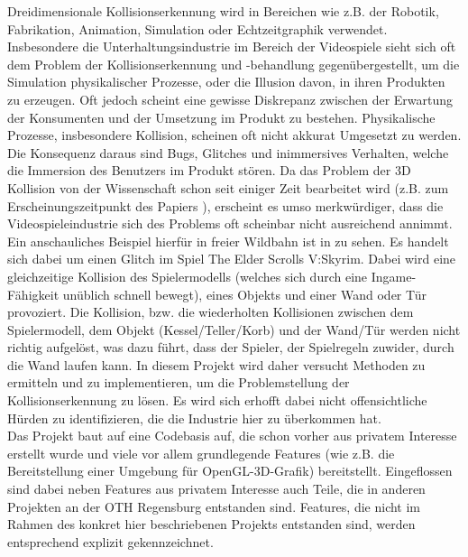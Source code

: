 
Dreidimensionale Kollisionserkennung wird in Bereichen wie z.B. der Robotik, Fabrikation, Animation, Simulation oder Echtzeitgraphik verwendet.
Insbesondere die Unterhaltungsindustrie im Bereich der Videospiele sieht sich oft dem Problem der Kollisionserkennung und -behandlung gegenübergestellt, um die Simulation physikalischer Prozesse, oder die Illusion davon, in ihren Produkten zu erzeugen.
Oft jedoch scheint eine gewisse Diskrepanz zwischen der Erwartung der Konsumenten und der Umsetzung im Produkt zu bestehen. Physikalische Prozesse, insbesondere Kollision, scheinen oft nicht akkurat Umgesetzt zu werden. Die Konsequenz daraus sind Bugs, Glitches und inimmersives Verhalten, welche die Immersion des Benutzers im Produkt stören.
Da das Problem der 3D Kollision von der Wissenschaft schon seit einiger Zeit bearbeitet wird (z.B. zum Erscheinungszeitpunkt des Papiers \cite{gjk}), erscheint es umso merkwürdiger, dass die Videospieleindustrie sich des Problems oft scheinbar nicht ausreichend annimmt.\\
Ein anschauliches Beispiel hierfür in freier Wildbahn ist in \cite{skyrimwallglitch} zu sehen. Es handelt sich dabei um einen Glitch im Spiel The Elder Scrolls V:Skyrim. Dabei wird eine gleichzeitige Kollision des Spielermodells (welches sich durch eine Ingame-Fähigkeit unüblich schnell bewegt), eines Objekts und einer Wand oder Tür provoziert. Die Kollision, bzw. die wiederholten Kollisionen zwischen dem Spielermodell, dem Objekt (Kessel/Teller/Korb) und der Wand/Tür werden nicht richtig aufgelöst, was dazu führt, dass der Spieler, der Spielregeln zuwider, durch die Wand laufen kann.
In diesem Projekt wird daher versucht Methoden zu ermitteln und zu implementieren, um die Problemstellung der Kollisionserkennung zu lösen.
Es wird sich erhofft dabei nicht offensichtliche Hürden zu identifizieren, die die Industrie hier zu überkommen hat. \\
Das Projekt baut auf eine Codebasis auf, die schon vorher aus privatem Interesse erstellt wurde und viele vor allem grundlegende Features (wie z.B. die Bereitstellung einer Umgebung für OpenGL-3D-Grafik) bereitstellt. Eingeflossen sind dabei neben Features aus privatem Interesse auch Teile, die in anderen Projekten an der OTH Regensburg entstanden sind. Features, die nicht im Rahmen des konkret hier beschriebenen Projekts entstanden sind, werden entsprechend explizit gekennzeichnet.